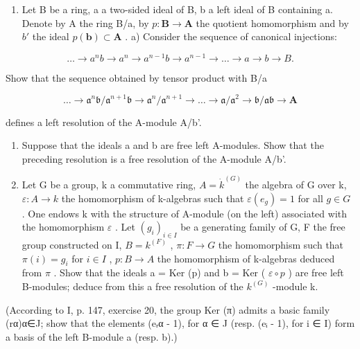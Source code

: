 \begin{enumerate}
\def\labelenumi{\arabic{enumi})}
\setcounter{enumi}{2}
\tightlist
\item
  Let B be a ring, a a two-sided ideal of B, b a left ideal of B containing a. Denote by A the ring B/a, by \(p: \mathbf{B} \to \mathbf{A}\) the quotient homomorphism and by \(b'\) the ideal \(p(\mathbf{b}) \subset \mathbf{A}\) . a) Consider the sequence of canonical injections:
\end{enumerate}

\[
\dots \rightarrow a ^ {n} b \rightarrow a ^ {n} \rightarrow a ^ {n - 1} b \rightarrow a ^ {n - 1} \rightarrow \dots \rightarrow a \rightarrow b \rightarrow B.
\]

Show that the sequence obtained by tensor product with B/a

\[
\dots \rightarrow \mathfrak {a} ^ {n} \mathfrak {b} / \mathfrak {a} ^ {n + 1} \mathfrak {b} \rightarrow \mathfrak {a} ^ {n} / \mathfrak {a} ^ {n + 1} \rightarrow \dots \rightarrow \mathfrak {a} / \mathfrak {a} ^ {2} \rightarrow \mathfrak {b} / \mathfrak {a b} \rightarrow \mathbf {A}
\]

defines a left resolution of the A-module A/b'.

\begin{enumerate}
\def\labelenumi{\alph{enumi})}
\setcounter{enumi}{1}
\item
  Suppose that the ideals a and b are free left A-modules. Show that the preceding resolution is a free resolution of the A-module A/b'.
\item
  Let G be a group, k a commutative ring, \(A = \dot{k}^{(G)}\) the algebra of G over k, \(\varepsilon : A \to k\) the homomorphism of k-algebras such that \(\varepsilon(e_g) = 1\) for all \(g \in G\) . One endows k with the structure of A-module (on the left) associated with the homomorphism \(\varepsilon\) . Let \((g_i)_{i \in I}\) be a generating family of G, F the free group constructed on I, \(B = k^{(F)}\) , \(\pi : F \to G\) the homomorphism such that \(\pi(i) = g_i\) for \(i \in I\) , \(p : B \to A\) the homomorphism of k-algebras deduced from \(\pi\) . Show that the ideals a = Ker (p) and b = Ker ( \(\varepsilon \circ p\) ) are free left B-modules; deduce from this a free resolution of the \(k^{(G)}\) -module k.
\end{enumerate}

(According to I, p. 147, exercise 20, the group Ker (π) admits a basic family (rα)α∈J; show that the elements (eᵣα - 1), for α ∈ J (resp. (eᵢ - 1), for i ∈ I) form a basis of the left B-module a (resp. b).)

